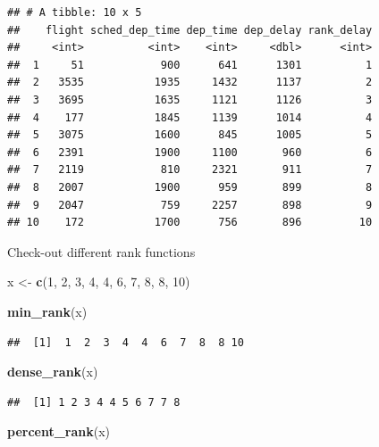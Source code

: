 \documentclass[]{book}
\newenvironment{Shaded}{\begin{snugshade}}{\end{snugshade}}
\newcommand{\DecValTok}[1]{\textcolor[rgb]{0.00,0.00,0.81}{#1}}
\newcommand{\KeywordTok}[1]{\textcolor[rgb]{0.13,0.29,0.53}{\textbf{#1}}}
\newcommand{\NormalTok}[1]{#1}
\newcommand{\StringTok}[1]{\textcolor[rgb]{0.31,0.60,0.02}{#1}}
\theoremstyle{definition}
\theoremstyle{definition}
\theoremstyle{definition}
\theoremstyle{remark}
\begin{document}
\begin{verbatim}
## # A tibble: 10 x 5
##    flight sched_dep_time dep_time dep_delay rank_delay
##     <int>          <int>    <int>     <dbl>      <int>
##  1     51            900      641      1301          1
##  2   3535           1935     1432      1137          2
##  3   3695           1635     1121      1126          3
##  4    177           1845     1139      1014          4
##  5   3075           1600      845      1005          5
##  6   2391           1900     1100       960          6
##  7   2119            810     2321       911          7
##  8   2007           1900      959       899          8
##  9   2047            759     2257       898          9
## 10    172           1700      756       896         10
\end{verbatim}

Check-out different rank functions

\begin{Shaded}
\begin{Highlighting}[]
\NormalTok{x <-}\StringTok{ }\KeywordTok{c}\NormalTok{(}\DecValTok{1}\NormalTok{, }\DecValTok{2}\NormalTok{, }\DecValTok{3}\NormalTok{, }\DecValTok{4}\NormalTok{, }\DecValTok{4}\NormalTok{, }\DecValTok{6}\NormalTok{, }\DecValTok{7}\NormalTok{, }\DecValTok{8}\NormalTok{, }\DecValTok{8}\NormalTok{, }\DecValTok{10}\NormalTok{)}

\KeywordTok{min_rank}\NormalTok{(x)}
\end{Highlighting}
\end{Shaded}

\begin{verbatim}
##  [1]  1  2  3  4  4  6  7  8  8 10
\end{verbatim}

\begin{Shaded}
\begin{Highlighting}[]
\KeywordTok{dense_rank}\NormalTok{(x)}
\end{Highlighting}
\end{Shaded}

\begin{verbatim}
##  [1] 1 2 3 4 4 5 6 7 7 8
\end{verbatim}

\begin{Shaded}
\begin{Highlighting}[]
\KeywordTok{percent_rank}\NormalTok{(x)}
\end{Highlighting}
\end{Shaded}
\end{document}
